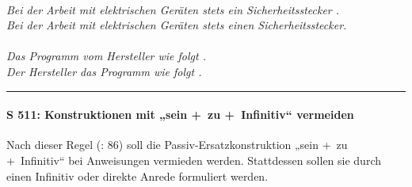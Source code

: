 \begin{description}[font=\normalfont\bfseries]
\item[Beispiele:]~ \\
  \textit{Bei der Arbeit mit elektrischen Geräten  stets ein Sicherheitsstecker .}\\
  \textit{Bei der Arbeit mit elektrischen Geräten  stets einen Sicherheitsstecker.}\\
  \\
  \textit{Das Programm  vom Hersteller wie folgt .}\\
  \textit{Der Hersteller  das Programm wie folgt .}\\
\end{description}

\hrule
\paragraph*{S 511: Konstruktionen mit „sein +~zu +~Infinitiv“ vermeiden}

Nach dieser Regel (\citealt{tekom2013}: 86) soll die Passiv-Ersatzkonstruktion „sein +~zu +~Infinitiv“ bei Anweisungen vermieden werden. Stattdessen sollen sie durch einen Infinitiv oder direkte Anrede formuliert werden.

